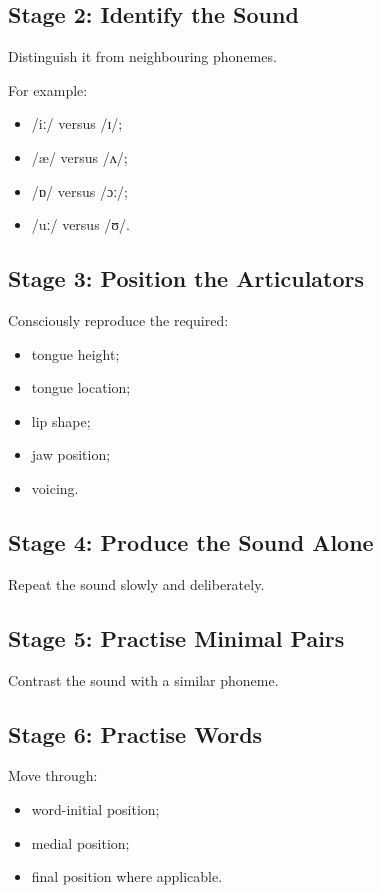 \subsection*{Stage 2: Identify the Sound}

Distinguish it from neighbouring phonemes.

For example:

\begin{itemize}
    \item /iː/ versus /ɪ/;
    \item /æ/ versus /ʌ/;
    \item /ɒ/ versus /ɔː/;
    \item /uː/ versus /ʊ/.
\end{itemize}

\subsection*{Stage 3: Position the Articulators}

Consciously reproduce the required:

\begin{itemize}
    \item tongue height;
    \item tongue location;
    \item lip shape;
    \item jaw position;
    \item voicing.
\end{itemize}

\subsection*{Stage 4: Produce the Sound Alone}

Repeat the sound slowly and deliberately.

\subsection*{Stage 5: Practise Minimal Pairs}

Contrast the sound with a similar phoneme.

\subsection*{Stage 6: Practise Words}

Move through:

\begin{itemize}
    \item word-initial position;
    \item medial position;
    \item final position where applicable.
\end{itemize}

